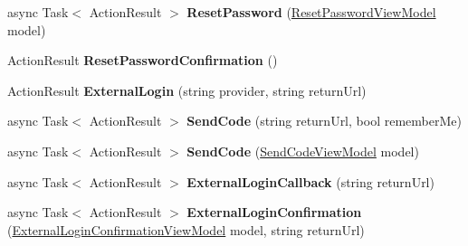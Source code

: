 \begin{DoxyCompactItemize}
\item 
async Task$<$ Action\+Result $>$ {\bfseries Reset\+Password} (\hyperlink{class_cloud_bread_admin_web_1_1_models_1_1_reset_password_view_model}{Reset\+Password\+View\+Model} model)\hypertarget{class_cloud_bread_admin_web_1_1_controllers_1_1_account_controller_aed92611d92bc62645f198738b2559576}{}\label{class_cloud_bread_admin_web_1_1_controllers_1_1_account_controller_aed92611d92bc62645f198738b2559576}

\item 
Action\+Result {\bfseries Reset\+Password\+Confirmation} ()\hypertarget{class_cloud_bread_admin_web_1_1_controllers_1_1_account_controller_a6ef5f5129df81ea7eedf82cdece7d2d2}{}\label{class_cloud_bread_admin_web_1_1_controllers_1_1_account_controller_a6ef5f5129df81ea7eedf82cdece7d2d2}

\item 
Action\+Result {\bfseries External\+Login} (string provider, string return\+Url)\hypertarget{class_cloud_bread_admin_web_1_1_controllers_1_1_account_controller_a7635a2faadc86831237f200498f7a419}{}\label{class_cloud_bread_admin_web_1_1_controllers_1_1_account_controller_a7635a2faadc86831237f200498f7a419}

\item 
async Task$<$ Action\+Result $>$ {\bfseries Send\+Code} (string return\+Url, bool remember\+Me)\hypertarget{class_cloud_bread_admin_web_1_1_controllers_1_1_account_controller_a1a8d7f86ccd6078b9249087d87a6da9a}{}\label{class_cloud_bread_admin_web_1_1_controllers_1_1_account_controller_a1a8d7f86ccd6078b9249087d87a6da9a}

\item 
async Task$<$ Action\+Result $>$ {\bfseries Send\+Code} (\hyperlink{class_cloud_bread_admin_web_1_1_models_1_1_send_code_view_model}{Send\+Code\+View\+Model} model)\hypertarget{class_cloud_bread_admin_web_1_1_controllers_1_1_account_controller_a99dab3cb95c5b5475322f578702ebaa5}{}\label{class_cloud_bread_admin_web_1_1_controllers_1_1_account_controller_a99dab3cb95c5b5475322f578702ebaa5}

\item 
async Task$<$ Action\+Result $>$ {\bfseries External\+Login\+Callback} (string return\+Url)\hypertarget{class_cloud_bread_admin_web_1_1_controllers_1_1_account_controller_a5760207883e656b3dd51d09e1883fe1a}{}\label{class_cloud_bread_admin_web_1_1_controllers_1_1_account_controller_a5760207883e656b3dd51d09e1883fe1a}

\item 
async Task$<$ Action\+Result $>$ {\bfseries External\+Login\+Confirmation} (\hyperlink{class_cloud_bread_admin_web_1_1_models_1_1_external_login_confirmation_view_model}{External\+Login\+Confirmation\+View\+Model} model, string return\+Url)\hypertarget{class_cloud_bread_admin_web_1_1_controllers_1_1_account_controller_acdf7512b03daeacb9ab9b8eaf3399ed0}{}\label{class_cloud_bread_admin_web_1_1_controllers_1_1_account_controller_acdf7512b03daeacb9ab9b8eaf3399ed0}


\end{DoxyCompactItemize}
